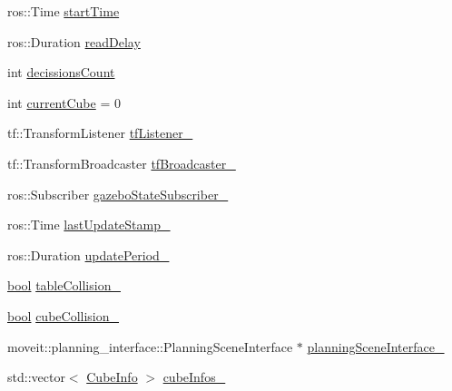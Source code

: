 \begin{DoxyCompactItemize}
\item 
ros\+::\+Time \hyperlink{classsm__moveit__4_1_1cl__perception__system_1_1ClPerceptionSystem_a0a4abfb676a3a6820ce09de9d4874fa5}{start\+Time}
\item 
ros\+::\+Duration \hyperlink{classsm__moveit__4_1_1cl__perception__system_1_1ClPerceptionSystem_a4389b3f1b2edc6924982746a9e8b4d8b}{read\+Delay}
\item 
int \hyperlink{classsm__moveit__4_1_1cl__perception__system_1_1ClPerceptionSystem_ac41f768142251a6a4330c6ca1050b2fe}{decissions\+Count}
\item 
int \hyperlink{classsm__moveit__4_1_1cl__perception__system_1_1ClPerceptionSystem_ae2a80b803814af8b3c87f810f2728af0}{current\+Cube} = 0
\item 
tf\+::\+Transform\+Listener \hyperlink{classsm__moveit__4_1_1cl__perception__system_1_1ClPerceptionSystem_a9eb7b96a518dc37a1145d8ad228cf462}{tf\+Listener\+\_\+}
\item 
tf\+::\+Transform\+Broadcaster \hyperlink{classsm__moveit__4_1_1cl__perception__system_1_1ClPerceptionSystem_a3ba2d336b66528d18312d8ad0c4a15a6}{tf\+Broadcaster\+\_\+}
\item 
ros\+::\+Subscriber \hyperlink{classsm__moveit__4_1_1cl__perception__system_1_1ClPerceptionSystem_af937d51058c115f6a7f39df9c1df6650}{gazebo\+State\+Subscriber\+\_\+}
\item 
ros\+::\+Time \hyperlink{classsm__moveit__4_1_1cl__perception__system_1_1ClPerceptionSystem_a848e2ccea34c23ab22846e4c43b0164d}{last\+Update\+Stamp\+\_\+}
\item 
ros\+::\+Duration \hyperlink{classsm__moveit__4_1_1cl__perception__system_1_1ClPerceptionSystem_a0cd8e545b3a0744f6e6c235d9e47d740}{update\+Period\+\_\+}
\item 
\hyperlink{classbool}{bool} \hyperlink{classsm__moveit__4_1_1cl__perception__system_1_1ClPerceptionSystem_ab8cc53236e3a3dfaa05ab35c843a6563}{table\+Collision\+\_\+}
\item 
\hyperlink{classbool}{bool} \hyperlink{classsm__moveit__4_1_1cl__perception__system_1_1ClPerceptionSystem_aa375d2ad7506dcfc8603558155ee893c}{cube\+Collision\+\_\+}
\item 
moveit\+::planning\+\_\+interface\+::\+Planning\+Scene\+Interface $\ast$ \hyperlink{classsm__moveit__4_1_1cl__perception__system_1_1ClPerceptionSystem_a7b0311554dc2efc15db1999adea877cb}{planning\+Scene\+Interface\+\_\+}
\item 
std\+::vector$<$ \hyperlink{structsm__moveit__4_1_1cl__perception__system_1_1CubeInfo}{Cube\+Info} $>$ \hyperlink{classsm__moveit__4_1_1cl__perception__system_1_1ClPerceptionSystem_ac4a5ed3c9acd94895b1986c55210da84}{cube\+Infos\+\_\+}

\end{DoxyCompactItemize}
